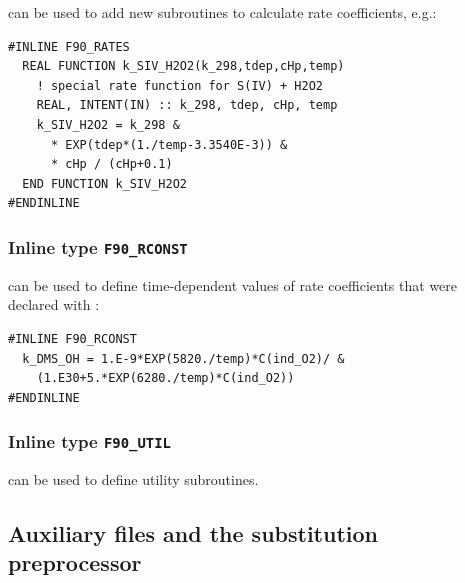 \documentclass[twoside]{article}
\begin{document}
 can be used to add new subroutines to calculate rate
coefficients, e.g.:
%
\begin{verbatim}
#INLINE F90_RATES
  REAL FUNCTION k_SIV_H2O2(k_298,tdep,cHp,temp)
    ! special rate function for S(IV) + H2O2
    REAL, INTENT(IN) :: k_298, tdep, cHp, temp
    k_SIV_H2O2 = k_298 &
      * EXP(tdep*(1./temp-3.3540E-3)) &
      * cHp / (cHp+0.1)
  END FUNCTION k_SIV_H2O2
#ENDINLINE
\end{verbatim}

\subsubsection{Inline type {\tt F90\_RCONST}}
\label{sec:f90-rconst}

 can be used to define time-dependent values of rate
coefficients that were declared with :
%
\begin{verbatim}
#INLINE F90_RCONST
  k_DMS_OH = 1.E-9*EXP(5820./temp)*C(ind_O2)/ &
    (1.E30+5.*EXP(6280./temp)*C(ind_O2))
#ENDINLINE
\end{verbatim}

\subsubsection{Inline type {\tt F90\_UTIL}}
\label{sec:f90-util}

 can be used to define utility subroutines.

\subsection{Auxiliary files and the substitution preprocessor}
\label{sec:substitution-preproc}
\end{document}
